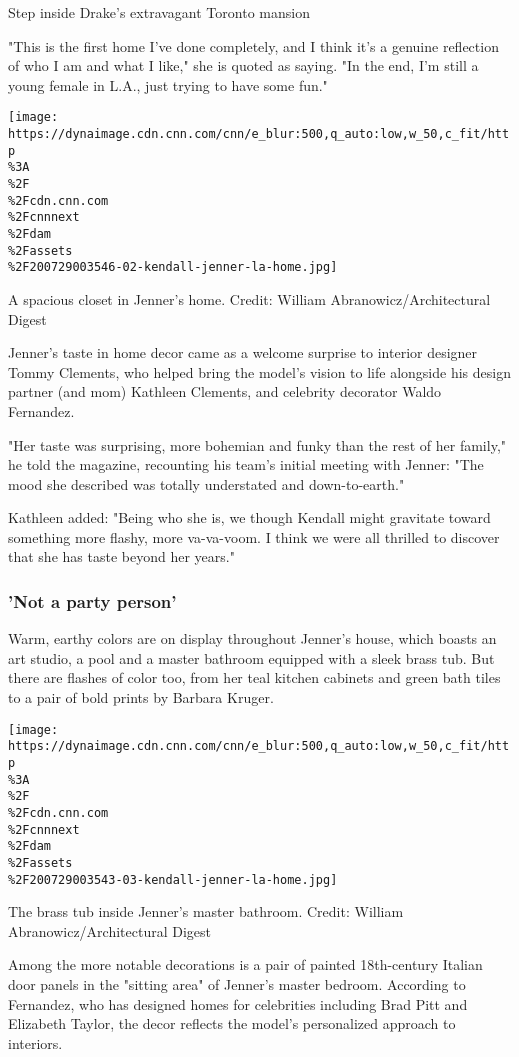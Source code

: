 Step inside Drake's extravagant Toronto mansion

"This is the first home I've done completely, and I think it's a genuine
reflection of who I am and what I like," she is quoted as saying. "In
the end, I'm still a young female in L.A., just trying to have some
fun."

\texttt{[image: https://dynaimage.cdn.cnn.com/cnn/e\_blur:500,q\_auto:low,w\_50,c\_fit/http\\\%3A\\\%2F\\\%2Fcdn.cnn.com\\\%2Fcnnnext\\\%2Fdam\\\%2Fassets\\\%2F200729003546-02-kendall-jenner-la-home.jpg]}

A spacious closet in Jenner's home. Credit: William
Abranowicz/Architectural Digest

Jenner's taste in home decor came as a welcome surprise to interior
designer Tommy Clements, who helped bring the model's vision to life
alongside his design partner (and mom) Kathleen Clements, and celebrity
decorator Waldo Fernandez.

"Her taste was surprising, more bohemian and funky than the rest of her
family," he told the magazine, recounting his team's initial meeting
with Jenner: "The mood she described was totally understated and
down-to-earth."

Kathleen added: "Being who she is, we though Kendall might gravitate
toward something more flashy, more va-va-voom. I think we were all
thrilled to discover that she has taste beyond her years."

\hypertarget{not-a-party-person}{%
\subsubsection{'Not a party person'}\label{not-a-party-person}}

Warm, earthy colors are on display throughout Jenner's house, which
boasts an art studio, a pool and a master bathroom equipped with a sleek
brass tub. But there are flashes of color too, from her teal kitchen
cabinets and green bath tiles to a pair of bold prints by Barbara
Kruger.

\texttt{[image: https://dynaimage.cdn.cnn.com/cnn/e\_blur:500,q\_auto:low,w\_50,c\_fit/http\\\%3A\\\%2F\\\%2Fcdn.cnn.com\\\%2Fcnnnext\\\%2Fdam\\\%2Fassets\\\%2F200729003543-03-kendall-jenner-la-home.jpg]}

The brass tub inside Jenner's master bathroom. Credit: William
Abranowicz/Architectural Digest

Among the more notable decorations is a pair of painted 18th-century
Italian door panels in the "sitting area" of Jenner's master bedroom.
According to Fernandez, who has designed homes for celebrities including
Brad Pitt and Elizabeth Taylor, the decor reflects the model's
personalized approach to interiors.

